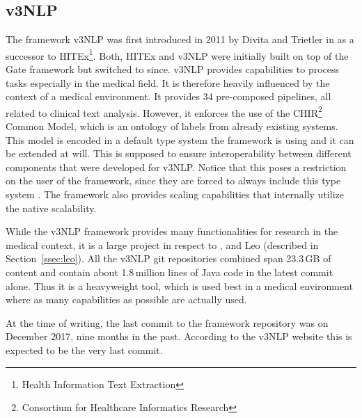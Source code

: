\subsection{v3NLP}
The framework v3NLP was first introduced in 2011 by Divita and Trietler in \cite{divita2011finding} as a successor to HITEx\footnote{Health Information Text Extraction}. Both, HITEx and v3NLP were initially built on top of the Gate framework but switched to \uima{} since. v3NLP provides capabilities to process \nlp{} tasks especially in the medical field. It is therefore heavily influenced by the context of a medical environment. It provides 34 pre-composed pipelines, all related to clinical text analysis. However, it enforces the use of the CHIR\footnote{Consortium for Healthcare Informatics Research} Common Model, which is an ontology of labels from already existing \nlp{} systems. This model is encoded in a default type system the framework is using and it can be extended at will. This is supposed to ensure interoperability between different \nlp{} components that were developed for v3NLP. Notice that this poses a restriction on the user of the framework, since they are forced to always include this type system \cite{divita2016v3nlp}. The framework also provides scaling capabilities that internally utilize the native \uimaas{} scalability.

While the v3NLP framework provides many functionalities for \nlp{} research in the medical context, it is a large project in respect to \uima{}, \uimaas{} and Leo (described in Section~\ref{ssec:leo}). All the v3NLP git repositories combined span 23.3\,GB of content and contain about 1.8\,million lines of Java code in the latest commit alone. Thus it is a heavyweight tool, which is used best in a medical environment where as many capabilities as possible are actually used.

At the time of writing, the last commit to the framework repository was on December 2017, nine months in the past. According to the v3NLP website this is expected to be the very last commit.





% 
% 
% 

